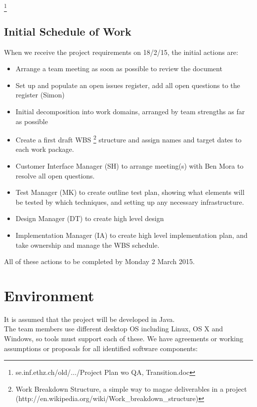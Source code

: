 \documentclass{article}
\begin{document}
\footnote{se.inf.ethz.ch/old/.../Project Plan wo QA, Transition.doc}
\subsection{Initial Schedule of Work}

When we receive the project requirements on 18/2/15, the initial actions are:

\begin{itemize}
  \item Arrange a team meeting as soon as possible to review the document
  \item Set up and populate an open issues register, add all open questions to the register (Simon)
  \item Initial decomposition into work domains, arranged by team strengths as far as possible
  \item Create a first draft WBS \footnote{Work Breakdown Structure, a simple way to magae deliverables in a project (http://en.wikipedia.org/wiki/Work\_breakdown\_structure)} structure and assign names and target dates to each work package.
  \item Customer Interface Manager (SH) to arrange meeting(s) with Ben Mora to resolve all open questions.
  \item Test Manager (MK) to create outline test plan, showing what elements will be tested by which techniques, and setting up any necessary infrastructure.
  \item Design Manager (DT) to create high level design
  \item Implementation Manager (IA) to create high level implementation plan, and take ownership and manage the WBS schedule.
\end{itemize}
All of these actions to be completed by Monday 2 March 2015.
\newpage
\section{Environment}

It is assumed that the project will be developed in Java.
\\
The team members use different desktop OS including Linux, OS X and Windows, so tools must support each of these. We have agreements or working assumptions or proposals for all identified software components:\par
\end{document}
